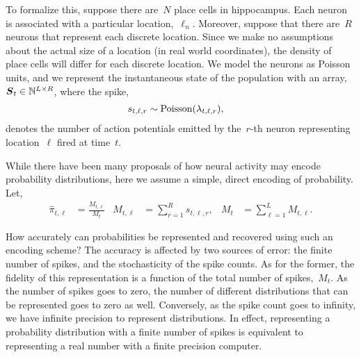 To formalize this, suppose there are~$N$ place cells in
hippocampus. Each neuron is associated with a particular
location,~$\ell_n$. Moreover, suppose that there are~$R$ neurons that
represent each discrete location.  Since we make no assumptions about
the actual size of a location (in real world coordinates), the density
of place cells will differ for each discrete location.
We model the neurons as Poisson units, and we represent the instantaneous 
state of the population with an array,~${\boldsymbol{S}_t \in \mathbb{N}^{L \times R}}$,
where the  spike,
\begin{align}
s_{t,\ell,r} &\sim \mathrm{Poisson}(\lambda_{t, \ell, r}),
\end{align} denotes the number of action potentials
emitted by the~$r$-th neuron
representing location~$\ell$ fired at time~$t$.

While there have been many proposals of how neural activity may encode
probability distributions, here we assume a simple, direct encoding of
probability. Let,
\begin{align}
  \label{eq:pr_rep}
  \widehat{\pi}_{t, \ell} &= \frac{M_{t, \ell}}{M_t} &
  M_{t,\ell} &= \sum_{r=1}^R s_{t,\ell,r}, &
  M_t &= \sum_{\ell=1}^L M_{t,\ell}.
\end{align}

How accurately can probabilities be represented and recovered using 
such an encoding scheme? The accuracy is affected by two sources of error: 
the finite number of spikes, and the stochasticity of the spike 
counts. As for the former, the fidelity of this representation 
is a function of the total number of spikes,~$M_t$. As the number 
of spikes goes to zero, the number of different distributions that 
can be represented goes to zero as well. Conversely, as the spike 
count goes to infinity, we have infinite precision to represent 
distributions. In effect, representing a probability distribution 
with a finite number of spikes is equivalent to representing a 
real number with a finite precision computer. 


